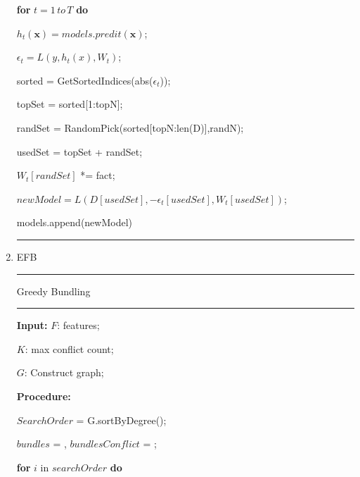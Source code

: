 \documentclass[a4paper]{article}
\begin{document}
\begin{enumerate}
						\hspace*{48pt} \textbf{for} $t=1\, to\, T$ \textbf{do}\par
						\hspace*{64pt}	$h_t(\textbf{x}) = models.predit(\textbf{x})$;\par
						\hspace*{64pt}	$\epsilon_t = L(y,h_t(x),W_t)$;\par
						\hspace*{64pt}	sorted = GetSortedIndices(abs($\epsilon_t$));\par
						\hspace*{64pt}	topSet = sorted[1:topN];\par
						\hspace*{64pt}	randSet = RandomPick(sorted[topN:len(D)],randN);\par
						\hspace*{64pt}  usedSet = topSet + randSet;\par
						\hspace*{64pt}  $W_t[randSet]$ *= fact; \par
						\hspace*{64pt}  $newModel = L(D[usedSet], -\epsilon_t[usedSet],W_t[usedSet])$;\par
						\hspace*{64pt}  models.append(newModel)\par
				\noindent\rule[0.10\baselineskip]{\textwidth}{0.75pt}\par
			\item EFB\par
				\noindent\rule[0.10\baselineskip]{\textwidth}{0.5pt}\par
				Greedy Bundling\\
				\noindent\rule[0.10\baselineskip]{\textwidth}{0.5pt}
						\textbf{Input:} $F$: features;\par
						\hspace*{32pt} 	$K$: max conflict count;\par
						\hspace*{32pt} 	$G$: Construct graph;\par
						\textbf{Procedure:}\par
						\hspace*{32pt} 	$SearchOrder$ = G.sortByDegree();\par
						\hspace*{32pt} 	$bundles$ = {}, $bundlesConflict$ = {};\par
						\hspace*{48pt}	\textbf{for} $i$ in $searchOrder$ \textbf{do}\par

\end{enumerate}
\end{document}

